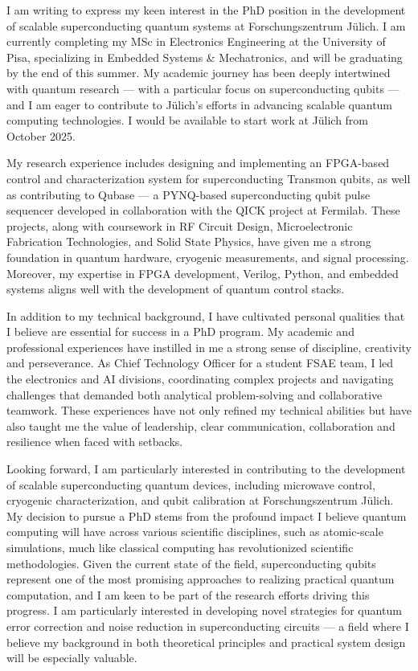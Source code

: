 \documentclass[12pt,stdletter,dateno]{newlfm}
\begin{document}
    \begin{newlfm}
        
        I am writing to express my keen interest in the PhD position in the development of scalable superconducting quantum systems at Forschungszentrum Jülich. I am currently completing my MSc in Electronics Engineering at the University of Pisa, specializing in Embedded Systems \& Mechatronics, and will be graduating by the end of this summer. My academic journey has been deeply intertwined with quantum research — with a particular focus on superconducting qubits — and I am eager to contribute to Jülich’s efforts in advancing scalable quantum computing technologies. I would be available to start work at Jülich from October 2025.
        
        My research experience includes designing and implementing an FPGA-based control and characterization system for superconducting Transmon qubits, as well as contributing to Qubase — a PYNQ-based superconducting qubit pulse sequencer developed in collaboration with the QICK project at Fermilab. These projects, along with coursework in RF Circuit Design, Microelectronic Fabrication Technologies, and Solid State Physics, have given me a strong foundation in quantum hardware, cryogenic measurements, and signal processing. Moreover, my expertise in FPGA development, Verilog, Python, and embedded systems aligns well with the development of quantum control stacks.
        
        In addition to my technical background, I have cultivated personal qualities that I believe are essential for success in a PhD program. My academic and professional experiences have instilled in me a strong sense of discipline, creativity and perseverance. As Chief Technology Officer for a student FSAE team, I led the electronics and AI divisions, coordinating complex projects and navigating challenges that demanded both analytical problem-solving and collaborative teamwork. These experiences have not only refined my technical abilities but have also taught me the value of leadership, clear communication, collaboration and resilience when faced with setbacks.
        
        Looking forward, I am particularly interested in contributing to the development of scalable superconducting quantum devices, including microwave control, cryogenic characterization, and qubit calibration at Forschungszentrum Jülich. My decision to pursue a PhD stems from the profound impact I believe quantum computing will have across various scientific disciplines, such as atomic-scale simulations, much like classical computing has revolutionized scientific methodologies. Given the current state of the field, superconducting qubits represent one of the most promising approaches to realizing practical quantum computation, and I am keen to be part of the research efforts driving this progress. I am particularly interested in developing novel strategies for quantum error correction and noise reduction in superconducting circuits — a field where I believe my background in both theoretical principles and practical system design will be especially valuable.
        

\end{newlfm}
\end{document}
